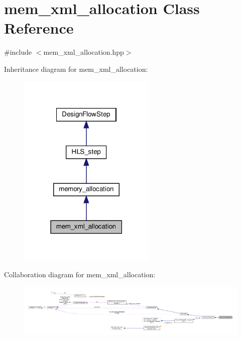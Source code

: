\hypertarget{classmem__xml__allocation}{}\section{mem\+\_\+xml\+\_\+allocation Class Reference}
\label{classmem__xml__allocation}


{\ttfamily \#include $<$mem\+\_\+xml\+\_\+allocation.\+hpp$>$}



Inheritance diagram for mem\+\_\+xml\+\_\+allocation\+:
\nopagebreak
\begin{figure}[H]
\begin{center}
\leavevmode
\includegraphics[width=186pt]{d9/dbb/classmem__xml__allocation__inherit__graph}
\end{center}
\end{figure}


Collaboration diagram for mem\+\_\+xml\+\_\+allocation\+:
\nopagebreak
\begin{figure}[H]
\begin{center}
\leavevmode
\includegraphics[width=350pt]{df/d34/classmem__xml__allocation__coll__graph}
\end{center}
\end{figure}
